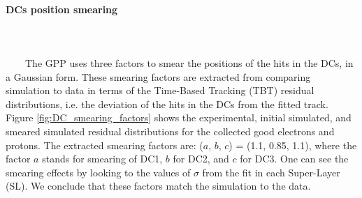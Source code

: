 \paragraph{DCs position smearing}
~\\
~\\
~~~~The GPP uses three factors to smear the positions of the hits in the DCs, in a Gaussian form. These smearing factors are extracted from comparing simulation to data in terms of the Time-Based Tracking (TBT) residual distributions, i.e. the deviation of the hits in the DCs from the fitted track. Figure \ref{fig:DC_smearing_factors} shows the experimental, initial simulated, and smeared simulated residual distributions for the collected good electrons and protons. The extracted smearing factors are: ($a$, $b$, $c$) = (1.1, 0.85, 1.1), where the factor $a$ stands for smearing of DC1, $b$ for DC2, and $c$ for DC3. One can see the smearing effects by looking to the values of $\sigma$ from the fit in each Super-Layer (SL). We conclude that these factors match the simulation to the data.
